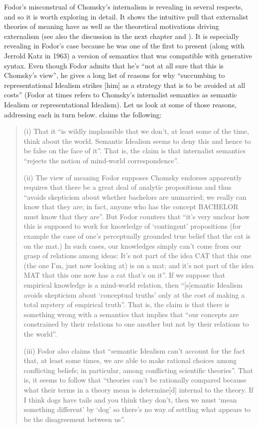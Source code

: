 Fodor’s misconstrual of Chomsky’s internalism is revealing in several respects, and so it is worth exploring in detail. It shows the intuitive pull that externalist theories of meaning have as well as the theoretical motivations driving externalism (see also the discussion in the next chapter and \citealt{Slezak2002,Slezak2004,Slezak2018}). It is especially revealing in Fodor’s case because he was one of the first to present (along with Jerrold Katz in 1963) a version of semantics that was compatible with generative syntax. Even though Fodor admits that he’s “not at all sure that this is Chomsky’s view”, he gives a long list of reasons for why “succumbing to representational Idealism strikes [him] as a strategy that is to be avoided at all costs” \citep[6]{Fodor2007} (Fodor at times refers to Chomsky’s internalist semantics as semantic Idealism or representational Idealism). Let us look at some of those reasons, addressing each in turn below. \citet[7--8]{Fodor2007} claims the following:
\begin{quote}
(i) That it “is wildly implausible that we don’t, at least some of the time, think about the world. Semantic Idealism seems to deny this and hence to be false on the face of it”. That is, the claim is that internalist semantics “rejects the notion of mind-world correspondence”. 

(ii) The view of meaning Fodor supposes Chomsky endorses apparently requires that there be a great deal of analytic propositions and thus “avoids skepticism about whether bachelors are unmarried; we really can know that they are; in fact, anyone who has the concept BACHELOR must know that they are”. But Fodor counters that “it’s very unclear how this is supposed to work for knowledge of ‘contingent’ propositions (for example the case of one’s perceptually grounded true belief that the cat is on the mat.) In such cases, our knowledges simply can’t come from our grasp of relations among ideas: It’s not part of the idea CAT that this one (the one I’m, just now looking at) is on a mat; and it’s not part of the idea MAT that this one now has a cat that’s on it”. If we suppose that empirical knowledge is a mind-world relation, then “[s]emantic Idealism avoids skepticism about ‘conceptual truths’ only at the cost of making a total mystery of empirical truth”. That is, the claim is that there is something wrong with a semantics that implies that “our concepts are constrained by their relations to one another but not by their relations to the world”.

(iii) Fodor also claims that “semantic Idealism can’t account for the fact that, at least some times, we are able to make rational choices among conflicting beliefs; in particular, among conflicting scientific theories”. That is, it seems to follow that “theories can’t be rationally compared because what their terms in a theory mean is determine[d] internal to the theory. If I think dogs have tails and you think they don’t, then we must ‘mean something different’ by ‘dog’ so there’s no way of settling what appears to be the disagreement between us”.
\end{quote}


